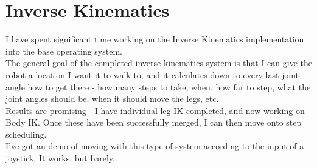 		\chapter{Inverse Kinematics}
			I have spent significant time working on the Inverse Kinematics implementation into the base operating system.\\
			
			The general goal of the completed inverse kinematics system is that I can give the robot a location I want it to walk to, and it calculates down to every last joint angle how to get there - how many steps to take, when, how far to step, what the joint angles should be, when it should move the legs, etc.\\
			
			Results are promising - I have individual leg IK completed, and now working on Body IK. Once these have been successfully merged, I can then move onto step scheduling.\\
			
			I've got an  demo of moving with this type of system according to the input of a joystick. It works, but barely.\\